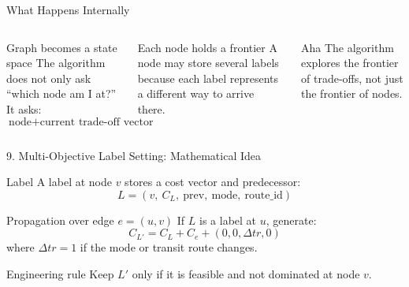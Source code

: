 \documentclass[aspectratio=169]{beamer}
\begin{document}
\begin{frame}{What Happens Internally}
    \begin{columns}[T]
        \begin{block}{Graph becomes a state space}
            The algorithm does not only ask ``which node am I at?'' It asks:
            \[
                \text{node} + \text{current trade-off vector}
            \]
        \end{block}

        \begin{block}{Each node holds a frontier}
            A node may store several labels because each label represents a different way to arrive there.
        \end{block}

        \centering

        \begin{alertblock}{Aha}
            The algorithm explores the frontier of trade-offs, not just the frontier of nodes.
        \end{alertblock}
    \end{columns}
\end{frame}

\begin{frame}{9. Multi-Objective Label Setting: Mathematical Idea}
    \begin{block}{Label}
        A label at node \(v\) stores a cost vector and predecessor:
        \[
            L = (v,\ C_L,\ \text{prev},\ \text{mode},\ \text{route\_id})
        \]
    \end{block}

    \begin{block}{Propagation over edge \(e=(u,v)\)}
        If \(L\) is a label at \(u\), generate:
        \[
            C_{L'} = C_L + C_e + (0,0,\Delta tr,0)
        \]
        where \(\Delta tr=1\) if the mode or transit route changes.
    \end{block}

    \begin{alertblock}{Engineering rule}
        Keep \(L'\) only if it is feasible and not dominated at node \(v\).
    \end{alertblock}
\end{frame}
\end{document}
